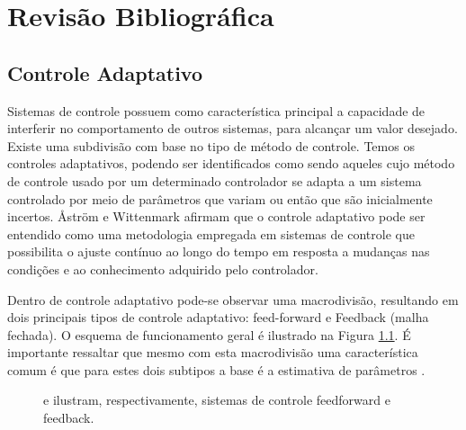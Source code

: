 \chapter{Revisão Bibliográfica}
\label{cap:descr}

\section{Controle Adaptativo}
\label{sec:adapt}
Sistemas de controle possuem como característica principal a capacidade de interferir no comportamento de outros sistemas, para alcançar um valor desejado. Existe uma subdivisão com base no tipo de método de controle. Temos os controles adaptativos, podendo ser identificados como sendo  aqueles cujo método de controle usado por um determinado controlador se adapta a um sistema controlado por meio de parâmetros que variam ou então que são inicialmente incertos. Åström e Wittenmark \cite{controle_adaptativo_livro} afirmam que o controle adaptativo pode ser entendido como uma metodologia empregada em sistemas de controle que possibilita o ajuste contínuo ao longo do tempo em resposta a mudanças nas condições e ao conhecimento adquirido pelo controlador.

Dentro de controle adaptativo pode-se observar uma macrodivisão, resultando em dois principais tipos de controle adaptativo: feed-forward e Feedback (malha fechada). O esquema de funcionamento geral é ilustrado na Figura \ref{fig:controle_adaptativo}. É importante ressaltar que mesmo com esta macrodivisão uma característica comum é que para estes dois subtipos a base é a estimativa de parâmetros \cite{ac_rl_intersections}.

\begin{figure}[h]
 \centering
   \qquad
   \caption{{} e {} ilustram, respectivamente, sistemas de controle feedforward e feedback.}
  \label{fig:controle_adaptativo}
\end{figure}

